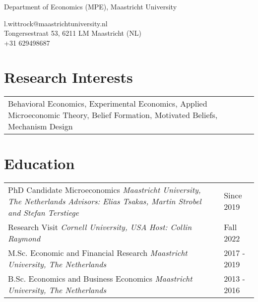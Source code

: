 \documentclass[11pt]{article}
\begin{document}
 

\pagestyle{empty} 

\par{\par}  
\parskip 12pt

\begin{center}
		Department of Economics (MPE), Maastricht University 	\\
		\rule{0pt}{4ex} \faSendO{} l.wittrock@maastrichtuniversity.nl \\
 								\Letter{} Tongersestraat 53, 6211 LM Maastricht (NL) \\
 								\faPhone{} +31 629498687
 \end{center}
	

\section{Research Interests}

\noindent\begin{tabular}{L{16cm}}
 Behavioral Economics, Experimental Economics, Applied Microeconomic Theory, Belief Formation, Motivated Beliefs, Mechanism Design
\end{tabular}


\section{Education}
\noindent\begin{tabular}{L{14cm}L{3cm}}
PhD Candidate Microeconomics \newline \textit{Maastricht University, The Netherlands}	\newline \textit{Advisors: Elias Tsakas, Martin Strobel and Stefan Terstiege} & Since 2019   \\
\rule{0pt}{4ex}Research Visit  \newline \textit{Cornell University, USA} \newline \textit{Host: Collin Raymond} & Fall 2022  \\
\rule{0pt}{4ex}M.Sc. Economic and Financial Research  \newline \textit{Maastricht University, The Netherlands}  & 2017 - 2019  \\
\rule{0pt}{4ex}B.Sc. Economics and Business Economics  \newline \textit{Maastricht University, The Netherlands} 	& 2013 - 2016 	
\end{tabular}
\end{document}

